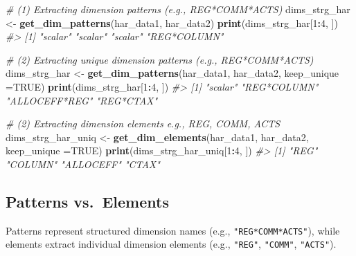 \documentclass[
]{article}
\newenvironment{Shaded}{\begin{snugshade}}{\end{snugshade}}
\newcommand{\AttributeTok}[1]{\textcolor[rgb]{0.13,0.29,0.53}{#1}}
\newcommand{\CommentTok}[1]{\textcolor[rgb]{0.56,0.35,0.01}{\textit{#1}}}
\newcommand{\ConstantTok}[1]{\textcolor[rgb]{0.56,0.35,0.01}{#1}}
\newcommand{\DecValTok}[1]{\textcolor[rgb]{0.00,0.00,0.81}{#1}}
\newcommand{\FunctionTok}[1]{\textcolor[rgb]{0.13,0.29,0.53}{\textbf{#1}}}
\newcommand{\NormalTok}[1]{#1}
\newcommand{\OtherTok}[1]{\textcolor[rgb]{0.56,0.35,0.01}{#1}}
\newcommand{\SpecialCharTok}[1]{\textcolor[rgb]{0.81,0.36,0.00}{\textbf{#1}}}
\begin{document}
\begin{Shaded}
\begin{Highlighting}[]
\CommentTok{\# (1) Extracting dimension patterns (e.g., REG*COMM*ACTS)}
\NormalTok{dims\_strg\_har }\OtherTok{\textless{}{-}} \FunctionTok{get\_dim\_patterns}\NormalTok{(har\_data1, har\_data2)}
\FunctionTok{print}\NormalTok{(dims\_strg\_har[}\DecValTok{1}\SpecialCharTok{:}\DecValTok{4}\NormalTok{, ])}
\CommentTok{\#\textgreater{} [1] "scalar"     "scalar"     "scalar"     "REG*COLUMN"}

\CommentTok{\# (2) Extracting unique dimension patterns (e.g., REG*COMM*ACTS)}
\NormalTok{dims\_strg\_har }\OtherTok{\textless{}{-}} \FunctionTok{get\_dim\_patterns}\NormalTok{(har\_data1, har\_data2,}
                                  \AttributeTok{keep\_unique =}\ConstantTok{TRUE}\NormalTok{)}
\FunctionTok{print}\NormalTok{(dims\_strg\_har[}\DecValTok{1}\SpecialCharTok{:}\DecValTok{4}\NormalTok{, ])}
\CommentTok{\#\textgreater{} [1] "scalar"       "REG*COLUMN"   "ALLOCEFF*REG" "REG*CTAX"}

\CommentTok{\# (2) Extracting dimension elements e.g., REG, COMM, ACTS}
\NormalTok{dims\_strg\_har\_uniq }\OtherTok{\textless{}{-}} \FunctionTok{get\_dim\_elements}\NormalTok{(har\_data1, har\_data2, }
                                       \AttributeTok{keep\_unique =}\ConstantTok{TRUE}\NormalTok{)}
\FunctionTok{print}\NormalTok{(dims\_strg\_har\_uniq[}\DecValTok{1}\SpecialCharTok{:}\DecValTok{4}\NormalTok{, ])}
\CommentTok{\#\textgreater{} [1] "REG"      "COLUMN"   "ALLOCEFF" "CTAX"}
\end{Highlighting}
\end{Shaded}

\subsection{Patterns vs.~Elements}\label{patterns-vs.-elements}

Patterns represent structured dimension names (e.g.,
\texttt{"REG*COMM*ACTS"}), while elements extract individual dimension
elements (e.g., \texttt{"REG"}, \texttt{"COMM"}, \texttt{"ACTS"}).
\end{document}
